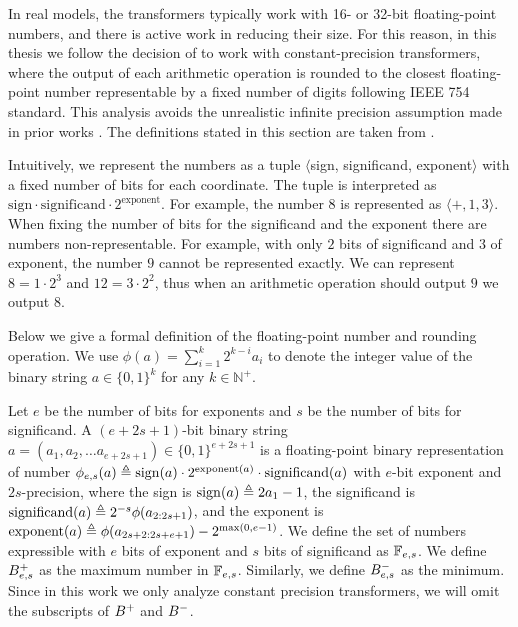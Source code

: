 In real models, the transformers typically work with 16- or 32-bit floating-point numbers, and there is active work in reducing their size.
For this reason, in this thesis we follow the decision of \citet{toyota} to work with constant-precision transformers, where the output of each arithmetic operation is rounded to the closest floating-point number representable by a fixed number of digits following IEEE 754 standard.
This analysis avoids the unrealistic infinite precision assumption made in prior works \citep{perez2019turing}.
The definitions stated in this section are taken from \citet{toyota}.


Intuitively, we represent the numbers as a tuple $\langle$sign, significand, exponent$\rangle$ with a fixed number of bits for each coordinate.
The tuple is interpreted as $\text{sign} \cdot \text{significand} \cdot 2^{\text{exponent}}$.
For example, the number $8$ is represented as $\langle +, 1, 3\rangle$.
When fixing the number of bits for the significand and the exponent there are numbers non-representable.
For example, with only $2$ bits of significand and $3$ of exponent, the number $9$ cannot be represented exactly.
We can represent $8 = 1 \cdot 2^3$ and $12 = 3 \cdot 2^2$, thus when an arithmetic operation should output $9$ we output $8$.


Below we give a formal definition of the floating-point number and rounding operation. 
We use $\phi(a) = \sum_{i=1}^k 2^{k-i}a_i$ to denote the integer value of the binary string $a\in \{0,1\}^k$ for any $k\in\mathbb{N}^+$.




\begin{definition}
Let $e$ be the number of bits for exponents and $s$ be the number of bits for significand. 
A $(e+2s+1)$-bit binary string $a = (a_1, a_2, \ldots a_{e+2s+1})\in \{0,1\}^{e+2s+1}$ is a floating-point binary representation of number $\phi_{e,s}(a)\triangleq \mathrm{sign}(a)\cdot 2^{\mathrm{exponent}(a)} \cdot \mathrm{significand}(a)$ with $e$-bit exponent and $2s$-precision, where the sign is $\mathrm{sign}(a)\triangleq 2a_1-1$, the significand is $\mathrm{significand}(a)\triangleq 2^{-s}\phi(a_{2:2s+1})$, and the exponent is $\mathrm{exponent}(a)\triangleq \phi(a_{2s+2:2s+e+1})-2^{\max(0,e-1)}$.
We define the set of numbers expressible with $e$ bits of exponent and $s$ bits of significand as $\mathbb{F}_{e,s}$.
We define $B^{+}_{e,s}$ as the maximum number in $\mathbb{F}_{e,s}$.
Similarly, we define $B^{-}_{e,s}$ as the minimum.
Since in this work we only analyze constant precision transformers, we will omit the subscripts of $B^{+}$ and $B^{-}$.
\end{definition}


